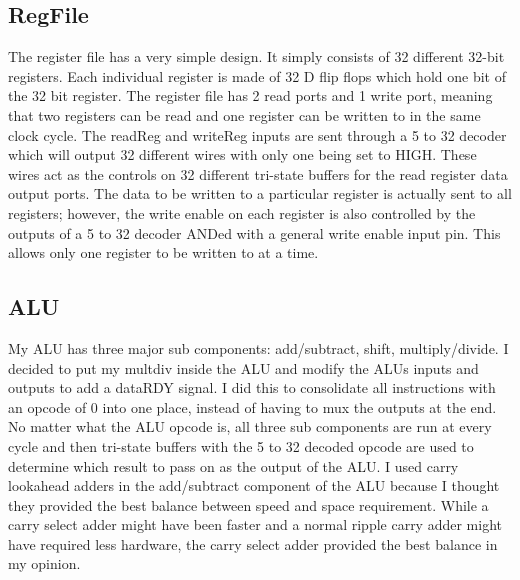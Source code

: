 \documentclass[letterpaper]{article} %
\begin{document}
\subsection*{RegFile}
The register file has a very simple design. It simply consists of 32 different 32-bit registers. Each individual register is made of 32 D flip flops which hold one bit of the 32 bit register. The register file has 2 read ports and 1 write port, meaning that two registers can be read and one register can be written to in the same clock cycle. The readReg and writeReg inputs are sent through a 5 to 32 decoder which will output 32 different wires with only one being set to HIGH. These wires act as the controls on 32 different tri-state buffers for the read register data output ports. The data to be written to a particular register is actually sent to all registers; however, the write enable on each register is also controlled by the outputs of a 5 to 32 decoder ANDed with a general write enable input pin. This allows only one register to be written to at a time. 

\subsection*{ALU}
My ALU has three major sub components: add/subtract, shift, multiply/divide. I decided to put my multdiv inside the ALU and modify the ALUs inputs and outputs to add a dataRDY signal. I did this to consolidate all instructions with an opcode of 0 into one place, instead of having to mux the outputs at the end. No matter what the ALU opcode is, all three sub components are run at every cycle and then tri-state buffers with the 5 to 32 decoded opcode are used to determine which result to pass on as the output of the ALU. I used carry lookahead adders in the add/subtract component of the ALU because I thought they provided the best balance between speed and space requirement. While a carry select adder might have been faster and a normal ripple carry adder might have required less hardware, the carry select adder provided the best balance in my opinion. 
\end{document}
